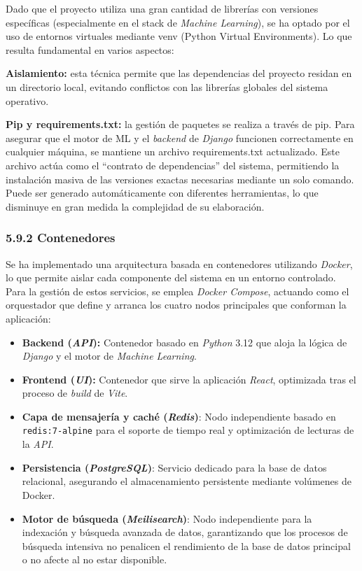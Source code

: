 Dado que el proyecto utiliza una gran cantidad de librerías con versiones específicas (especialmente 
en el stack de \textit{Machine Learning}), se ha optado por el uso de entornos virtuales mediante venv 
(Python Virtual Environments). Lo que resulta fundamental en varios aspectos:

\textbf{Aislamiento:} esta técnica permite que las dependencias del proyecto residan en un directorio 
local, evitando conflictos con las librerías globales del sistema operativo.

\textbf{Pip y requirements.txt:} la gestión de paquetes se realiza a través de pip. Para asegurar que 
el motor de ML y el \textit{backend} de \textit{Django} funcionen correctamente en cualquier máquina, se mantiene un 
archivo requirements.txt actualizado. Este archivo actúa como el ``contrato de dependencias'' del 
sistema, permitiendo la instalación masiva de las versiones exactas necesarias mediante un solo 
comando. Puede ser generado automáticamente con diferentes herramientas, lo que disminuye en gran 
medida la complejidad de su elaboración.

\subsubsection{5.9.2 Contenedores}

Se ha implementado una arquitectura basada en contenedores utilizando \textit{Docker}, lo que permite aislar 
cada componente del sistema en un entorno controlado. Para la gestión de estos servicios, se emplea 
\textit{Docker Compose}, actuando como el orquestador que define y arranca los cuatro nodos principales que 
conforman la aplicación:

\begin{itemize}
\item \textbf{Backend (\textit{API}):} Contenedor basado en \textit{Python} 3.12 que aloja la lógica de \textit{Django} y el 
motor de \textit{Machine Learning}.

\item \textbf{Frontend (\textit{UI}):} Contenedor que sirve la aplicación \textit{React}, optimizada tras el proceso 
de \textit{build} de \textit{Vite}.

\item \textbf{Capa de mensajería y caché (\textit{Redis})}: Nodo independiente basado en \texttt{redis:7-alpine} para el soporte de tiempo real y optimización de lecturas de la \textit{API}.
\item \textbf{Persistencia (\textit{PostgreSQL})}: Servicio dedicado para la base de datos relacional, 
asegurando el almacenamiento persistente mediante volúmenes de Docker.

\item \textbf{Motor de búsqueda (\textit{Meilisearch})}: Nodo independiente para la indexación y búsqueda 
avanzada de datos, garantizando que los procesos de búsqueda intensiva no penalicen el rendimiento 
de la base de datos principal o no afecte al no estar disponible.
\end{itemize}

